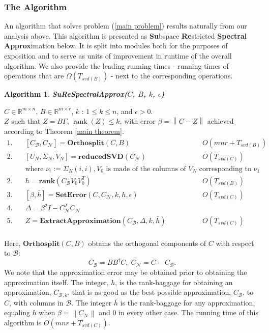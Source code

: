 \documentclass[11pt]{article}
\newcommand{\rank}{\operatorname{rank}}
\newtheorem{alg}{Algorithm}
\def\reals{\mathbb{R}}
\newcommand{\norm}[1]{\left\|#1\right\|}
\newcommand{\B}{\mathcal{B}}
\newcommand{\N}{\mathcal{N}}
\newcommand{\G}{\Gamma}
\newcommand{\0}{\ensuremath{\mathbf{0}}}
\renewcommand{\>}{\succ}
\newcommand{\<}{\prec}
\begin{document}
\subsubsection{The Algorithm}
An algorithm that solves problem (\ref{main problem}) results naturally from our analysis above. This algorithm is presented as \textbf{Su}bspace \textbf{Re}stricted \textbf{Spectral} \textbf{Approx}imation below. It is split into modules both for the purposes of exposition and to serve as units of improvement in runtime of the overall algorithm. We also provide the leading running times - running times of operations that are $\Omega(T_{svd(B)})$ - next to the corresponding operations.
\begin{framed}
\begin{alg}\label{alg:outline}
{\bf SuReSpectralApprox($C$, $B$, $k$, $\epsilon$) }
\end{alg}
 $C \in \reals^{m \times n}$, $B \in \reals^{m \times r}$, $k$ : $1 \leq k \leq n$, and $\epsilon > 0$.\\
 $Z$ such that $Z=B \G$, $\rank(Z) \leq k$, with error $\beta = \norm{C - Z}$ achieved according to Theorem \ref{main theorem}.
%
\begin{align*}
1. \quad& [C_{\B}, C_{\N}] = \textbf{Orthosplit}(C, B) & O(mnr + T_{svd(B)})\\
2. \quad& [U_N, \Sigma _N, V_N] = \textbf{reducedSVD}(C_{\N}) & O(T_{svd(C)}) \\ 
& \text{where } \nu_i := \Sigma _N (i, i), V_0 \text{ is made of the columns of  } V_N \text{ corresponding to } \nu_1 \\
2. \quad& h = \textbf{rank}(C_{\B} V_0 V_0 ^T)  & O\left(T_{svd(B)} \right)\\
3. \quad& [\beta,\bar h] = \textbf{SetError}(C, C_{\N}, k, h, \epsilon) & O\left( T_{svd(C)} \right) \\
4. \quad& \Delta = \beta^2 I - C_{\N} ^T C_{\N} & \\
5. \quad& Z = \textbf{ExtractApproximation}(C_{\B}, \Delta, k, \bar h) & O\left( T_{svd(C)} \right) \\
\end{align*}
%
\end{framed}

\noindent Here, $\textbf{Orthosplit}(C, B)$ obtains the orthogonal components of $C$ with respect to $\B$: 
\[ C_{\B} = BB^{\dagger} C, \; C_{\N} = C - C_{\B}. \] 
We note that the approximation error may be obtained prior to obtaining the approximation itself. The integer, $h$, is the rank-baggage for obtaining an approximation, $C_{\B, k}$, that is as good as the best possible approximation, $C_{\B}$, to $C$, with columns in $\B$. The integer $\bar{h}$ is the rank-baggage for any approximation, equaling $h$ when $\beta = \norm{C_{\N}}$ and 0 in every other case. The running time of this algorithm is $O\left( mnr + T_{svd(C)} \right)$.
\end{document}
